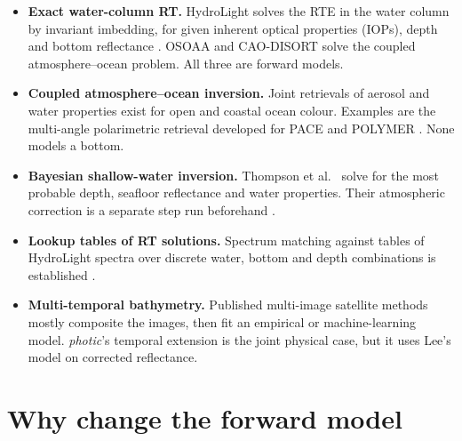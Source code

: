 \documentclass[11pt]{article}
\numberwithin{equation}{section}
\begin{document}
\begin{itemize}
\item \textbf{Exact water-column RT.} HydroLight solves the RTE in the water column by invariant
imbedding, for given inherent optical properties (IOPs), depth and bottom reflectance
\cite{mobley1994,oceanopticsbook}. OSOAA \cite{chami2015} and CAO-DISORT \cite{jin1994} solve
the coupled atmosphere--ocean problem. All three are forward models.
\item \textbf{Coupled atmosphere--ocean inversion.} Joint retrievals of aerosol and water
properties exist for open and coastal ocean colour. Examples are the multi-angle polarimetric
retrieval developed for PACE \cite{gao2019} and POLYMER \cite{steinmetz2011}. None models a
bottom.
\item \textbf{Bayesian shallow-water inversion.} Thompson et al.\ \cite{thompson2017} solve for
the most probable depth, seafloor reflectance and water properties. Their atmospheric
correction is a separate step run beforehand \cite{thompson2018}.
\item \textbf{Lookup tables of RT solutions.} Spectrum matching against tables of HydroLight
spectra over discrete water, bottom and depth combinations is established \cite{mobley2005}.
\item \textbf{Multi-temporal bathymetry.} Published multi-image satellite methods mostly
composite the images, then fit an empirical or machine-learning model. \textit{photic}'s
temporal extension \cite{blake2020} is the joint physical case, but it uses Lee's model on
corrected reflectance.
\end{itemize}

\section{Why change the forward model}\label{sec:why}
\end{document}
